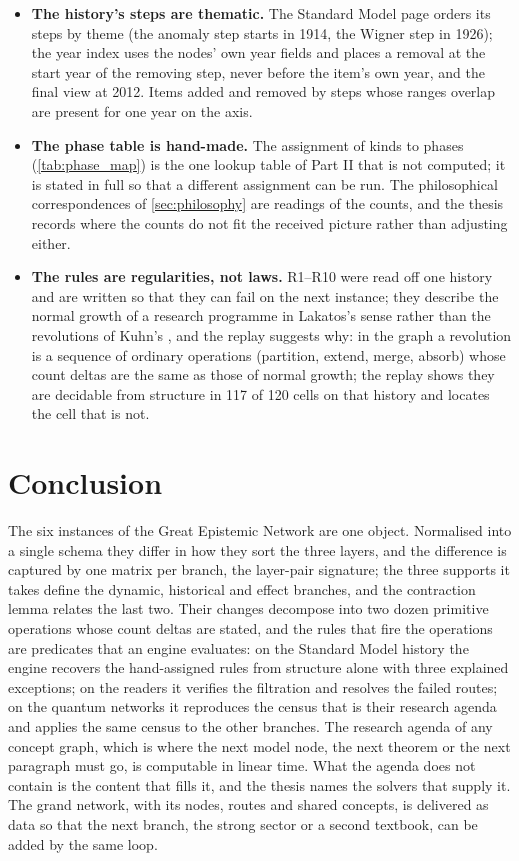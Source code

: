 \documentclass[11pt,a4paper,twoside,openany]{report}
\theoremstyle{plain}
\theoremstyle{definition}
\theoremstyle{remark}
\begin{document}
\begin{itemize}
\item \textbf{The history's steps are thematic.} The Standard Model page orders its steps by theme (the anomaly step starts in 1914, the Wigner step in 1926); the year index uses the nodes' own year fields and places a removal at the start year of the removing step, never before the item's own year, and the final view at 2012. Items added and removed by steps whose ranges overlap are present for one year on the axis.
\item \textbf{The phase table is hand-made.} The assignment of kinds to phases (\cref{tab:phase_map}) is the one lookup table of Part II that is not computed; it is stated in full so that a different assignment can be run. The philosophical correspondences of \cref{sec:philosophy} are readings of the counts, and the thesis records where the counts do not fit the received picture rather than adjusting either.
\item \textbf{The rules are regularities, not laws.} R1--R10 were read off one history and are written so that they can fail on the next instance; they describe the normal growth of a research programme in Lakatos's sense \citep{lakatos1970} rather than the revolutions of Kuhn's \citep{kuhn1962}, and the replay suggests why: in the graph a revolution is a sequence of ordinary operations (partition, extend, merge, absorb) whose count deltas are the same as those of normal growth; the replay shows they are decidable from structure in 117 of 120 cells on that history and locates the cell that is not.
\end{itemize}

\chapter{Conclusion}
The six instances of the Great Epistemic Network are one object. Normalised into a single schema they differ in how they sort the three layers, and the difference is captured by one matrix per branch, the layer-pair signature; the three supports it takes define the dynamic, historical and effect branches, and the contraction lemma relates the last two. Their changes decompose into two dozen primitive operations whose count deltas are stated, and the rules that fire the operations are predicates that an engine evaluates: on the Standard Model history the engine recovers the hand-assigned rules from structure alone with three explained exceptions; on the readers it verifies the filtration and resolves the failed routes; on the quantum networks it reproduces the census that is their research agenda and applies the same census to the other branches. The research agenda of any concept graph, which is where the next model node, the next theorem or the next paragraph must go, is computable in linear time. What the agenda does not contain is the content that fills it, and the thesis names the solvers that supply it. The grand network, with its \NnNodes{} nodes, \NnRoutes{} routes and \NnConcepts{} shared concepts, is delivered as data so that the next branch, the strong sector or a second textbook, can be added by the same loop.
\end{document}
